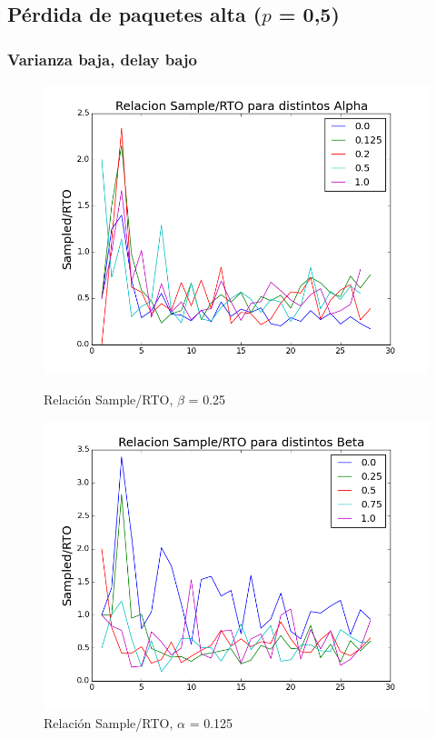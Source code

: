 \subsection{Pérdida de paquetes alta ($p$ = 0,5)}

\subsubsection{Varianza baja, delay bajo}

\begin{figure}[H]
\begin{minipage}{0.5\linewidth}
\includegraphics[width=\linewidth]{../graficos/alphad01var2drop50.png}
\caption{Relación Sample/RTO, $\beta$ = 0.25}\label{fig:alpha-var2-drop50}
\end{minipage}
\hfill
\begin{minipage}{0.5\linewidth}
\includegraphics[width=\linewidth]{../graficos/betad01var2drop50.png}
\caption{Relación Sample/RTO, $\alpha$ = 0.125}\label{fig:beta-var2-drop50}
\end{minipage}
\end{figure}

